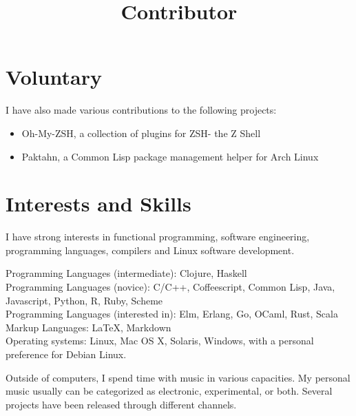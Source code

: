 \documentclass[margintitle,line]{res}
\renewcommand{\subsection}[1]{\section{\normalfont #1}}
\begin{document}
\begin{resume}
\subsection{Voluntary}

\title{Contributor}
\begin{position}
I have also made various contributions to the following projects:
\begin{itemize}
\item{Oh-My-ZSH, a collection of plugins for ZSH- the Z Shell}
\item{Paktahn, a Common Lisp package management helper for Arch Linux}
\end{itemize}
\end{position}

%
%
%
%
%
%

\section{Interests and Skills}

I have strong interests in functional programming, software engineering, programming languages, compilers and Linux software development.

Programming Languages (intermediate): Clojure, Haskell \\
Programming Languages (novice): C/C++, Coffeescript, Common Lisp, Java, Javascript, Python, R, Ruby, Scheme \\
Programming Languages (interested in): Elm, Erlang, Go, OCaml, Rust, Scala \\
Markup Languages: LaTeX, Markdown \\
Operating systems: Linux, Mac OS X, Solaris, Windows, with a personal preference for Debian Linux.

Outside of computers, I spend time with music in various capacities. My personal music usually can be categorized as electronic, experimental, or both. Several projects have been released through different channels.



\end{resume}
\end{document}
